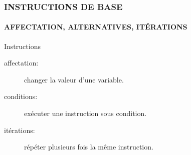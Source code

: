 \begin{frame}
\frametitle{\uppercase{Instructions de base}}
\framesubtitle{\uppercase{Affectation, alternatives, itérations}}
\begin{block}{Instructions}
\begin{description}
\item[affectation:] changer la valeur d'une variable.\vspace*{1mm}

\item[conditions:] exécuter une instruction sous condition.\vspace*{1mm}

\item[itérations:] répéter plusieurs fois la même instruction.\vspace*{1mm}


\mbox{}

\end{description}

\end{block}

\end{frame}
\note{
}


